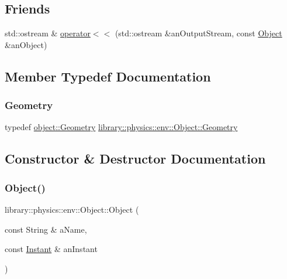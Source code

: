 \subsection*{Friends}
\begin{DoxyCompactItemize}
\item 
std\+::ostream \& \hyperlink{classlibrary_1_1physics_1_1env_1_1_object_a418df9bf4a73078f3d494edef1743f8d}{operator$<$$<$} (std\+::ostream \&an\+Output\+Stream, const \hyperlink{classlibrary_1_1physics_1_1env_1_1_object}{Object} \&an\+Object)
\end{DoxyCompactItemize}


\subsection{Member Typedef Documentation}
\mbox{\label{classlibrary_1_1physics_1_1env_1_1_object_abdf50733c7ad97327fb64edca5670f13}} 
\subsubsection{\texorpdfstring{Geometry}{Geometry}}
{\footnotesize\ttfamily typedef \hyperlink{classlibrary_1_1physics_1_1env_1_1object_1_1_geometry}{object\+::\+Geometry} \hyperlink{classlibrary_1_1physics_1_1env_1_1_object_abdf50733c7ad97327fb64edca5670f13}{library\+::physics\+::env\+::\+Object\+::\+Geometry}}



\subsection{Constructor \& Destructor Documentation}
\mbox{\label{classlibrary_1_1physics_1_1env_1_1_object_af112257aa51a94dcc61a36e2c0db4b05}} 
\subsubsection{\texorpdfstring{Object()}{Object()}\hspace{0.1cm}{\footnotesize\ttfamily [1/3]}}
{\footnotesize\ttfamily library\+::physics\+::env\+::\+Object\+::\+Object (\begin{DoxyParamCaption}\item[{const String \&}]{a\+Name,  }\item[{const \hyperlink{classlibrary_1_1physics_1_1time_1_1_instant}{Instant} \&}]{an\+Instant }\end{DoxyParamCaption})}

